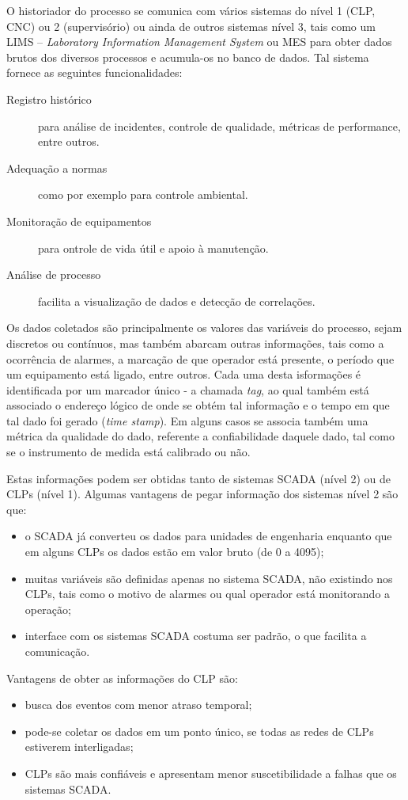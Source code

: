 O historiador do processo se comunica com vários sistemas do nível 1 (CLP, CNC) ou 2 (supervisório) ou ainda de outros sistemas nível 3, tais como um LIMS -- \emph{Laboratory Information Management System} ou MES para obter dados brutos dos diversos processos e acumula-os no banco de dados. Tal sistema fornece as seguintes funcionalidades:
\begin{description}
 	\item[Registro histórico] para análise de incidentes, controle de qualidade, métricas de performance, entre outros.
 	\item[Adequação a normas] como por exemplo para controle ambiental.
 	\item[Monitoração de equipamentos] para ontrole de vida útil e apoio à manutenção.
 	\item[Análise de processo] facilita a visualização de dados e detecção de correlações.
 \end{description}

Os dados coletados são principalmente os valores das variáveis do processo, sejam discretos ou contínuos, mas também abarcam outras informações, tais como a ocorrência de alarmes, a marcação de que operador está presente, o período que um equipamento está ligado, entre outros. Cada uma desta isformações é identificada por um marcador único - a chamada \emph{tag}, ao qual também está associado o endereço lógico de onde se obtém tal informação e o tempo em que tal dado foi gerado (\emph{time stamp}). Em alguns casos se associa também uma métrica da qualidade do dado, referente a confiabilidade daquele dado, tal como se o instrumento de medida está calibrado ou não.

Estas informações podem ser obtidas tanto de sistemas SCADA (nível 2) ou de CLPs (nível 1). Algumas vantagens de pegar informação dos sistemas nível 2 são que:
\begin{itemize}
	\item o SCADA já converteu os dados para unidades de engenharia enquanto que em alguns CLPs os dados estão em valor bruto (de 0 a 4095);
	\item muitas variáveis são definidas apenas no sistema SCADA, não existindo nos CLPs, tais como o motivo de alarmes ou qual operador está monitorando a operação;
	\item  interface com os sistemas SCADA costuma ser padrão, o que facilita a comunicação.
\end{itemize}

Vantagens de obter as informações do CLP são:
\begin{itemize}
	\item busca dos eventos com menor atraso temporal;
	\item pode-se coletar os dados em um ponto único, se todas as redes de CLPs estiverem interligadas;
	\item CLPs são mais confiáveis e apresentam menor suscetibilidade a falhas que os sistemas SCADA.
\end{itemize}

